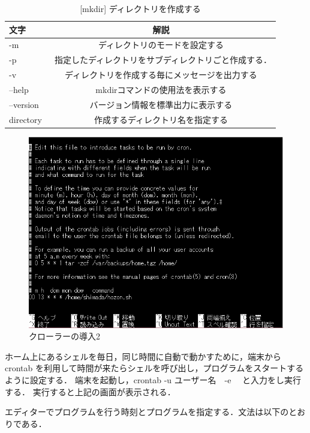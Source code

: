 \begin{table}[H]
  \begin{center}
    \caption{[mkdir] ディレクトリを作成する}
    \begin{tabular}{|l|c|} \hline
      文字 & 解説  \\ \hline
   -m & ディレクトリのモードを設定する　\\
    -p & 指定したディレクトリをサブディレクトリごと作成する．　\\
   -v & ディレクトリを作成する毎にメッセージを出力する　\\
   --help & mkdirコマンドの使用法を表示する \\
--version	& バージョン情報を標準出力に表示する \\
directory & 作成するディレクトリ名を指定する \\ \hline
    \end{tabular}
  \end{center}
\end{table}

\newpage

\begin{figure}[H]
\centering
\includegraphics[width=12cm]{hozon2.PNG}
\caption{クローラーの導入2}\label{サンプル図}
\end{figure}

ホーム上にあるシェルを毎日，同じ時間に自動で動かすために，端末からcrontab を利用して時間が来たらシェルを呼び出し，プログラムをスタートするように設定する．
端末を起動し，crontab -u ユーザー名　-e 　と入力をし実行する．
実行すると上記の画面が表示される．

エディターでプログラムを行う時刻とプログラムを指定する．文法は以下のとおりである．

